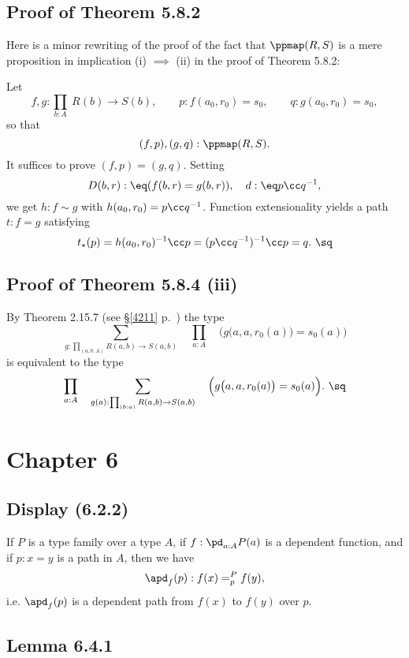 \documentclass[12pt]{article}
\begin{document}

\subsection{Proof of Theorem 5.8.2}\label{582}

Here is a minor rewriting of the proof of the fact that $\ppmap(R,S)$ is a mere proposition in implication (i) $\implies$ (ii) in the proof of Theorem 5.8.2: 

Let 
$$
f,g:\prod_{b:A}\ R(b)\to S(b),\qquad p:f(a_0,r_0)=s_0,\qquad q:g(a_0,r_0)=s_0,
$$ 
so that 
$$
(f,p),(g,q):\ppmap(R,S).
$$ 
It suffices to prove $(f,p)=(g,q)$. Setting 
$$
D(b,r):\eq(f(b,r)=g(b,r)),\quad d:\eq p\cc q^{-1},
$$ 
we get $h:f\sim g$ %
with $h(a_0,r_0)=p\cc q^{-1}$. Function extensionality yields a path $t:f=g$ satisfying 
$$
t_\star(p)=h(a_0,r_0)^{-1}\cc p=(p\cc q^{-1})^{-1}\cc p=q.\ \sq
$$


\subsection{Proof of Theorem 5.8.4 (iii)}

By Theorem 2.15.7 (see \S\ref{4211} p.~\pageref{4211}) the type 
$$
\sum_{g:\prod_{(a,b:A)}R(a,b)\to S(a,b)}\quad\prod_{a:A}\quad\Big(g\big(a,a,r_0(a)\big)=s_0(a)\Big)
$$ 
is equivalent to the type
$$
\prod_{a:A}\quad\sum_{g(a):\prod_{(b:a)}R(a,b)\to S(a,b)}\quad\Big(g\big(a,a,r_0(a)\big)=s_0(a)\Big).\ \sq
$$


\section{Chapter 6}

\subsection{Display (6.2.2)}

If $P$ is a type family over a type $A$, if $f:\pd_{a:A}P(a)$ is a dependent function, and if $p:x=y$ is a path in $A$, then we have 
$$
\apd_f(p):f(x)=^P_pf(y),
$$ 
i.e. $\apd_f(p)$ is a dependent path from $f(x)$ to $f(y)$ over $p$.


\subsection{Lemma 6.4.1}
\end{document}
